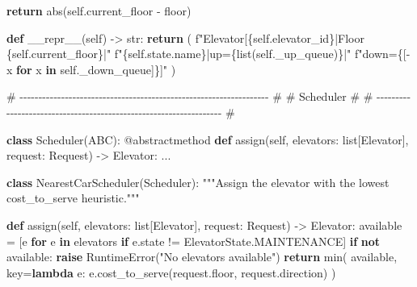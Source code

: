 \documentclass[11pt]{article}
\newenvironment{Shaded}{\begin{snugshade}}{\end{snugshade}}
\newcommand{\AttributeTok}[1]{\textcolor[rgb]{0.16,0.50,0.73}{#1}}
\newcommand{\BuiltInTok}[1]{\textcolor[rgb]{0.50,0.55,0.55}{#1}}
\newcommand{\CommentTok}[1]{\textcolor[rgb]{0.48,0.49,0.49}{#1}}
\newcommand{\ControlFlowTok}[1]{\textcolor[rgb]{0.99,0.74,0.29}{\textbf{#1}}}
\newcommand{\FunctionTok}[1]{\textcolor[rgb]{0.56,0.27,0.68}{#1}}
\newcommand{\KeywordTok}[1]{\textcolor[rgb]{0.81,0.81,0.76}{\textbf{#1}}}
\newcommand{\NormalTok}[1]{\textcolor[rgb]{0.81,0.81,0.76}{#1}}
\newcommand{\OperatorTok}[1]{\textcolor[rgb]{0.81,0.81,0.76}{#1}}
\newcommand{\PreprocessorTok}[1]{\textcolor[rgb]{0.15,0.68,0.38}{#1}}
\newcommand{\SpecialCharTok}[1]{\textcolor[rgb]{0.24,0.68,0.91}{#1}}
\newcommand{\SpecialStringTok}[1]{\textcolor[rgb]{0.85,0.27,0.33}{#1}}
\newcommand{\StringTok}[1]{\textcolor[rgb]{0.96,0.31,0.31}{#1}}
\newcommand{\VariableTok}[1]{\textcolor[rgb]{0.15,0.68,0.68}{#1}}
\begin{document}
\begin{Shaded}
\begin{Highlighting}[]
        \ControlFlowTok{return} \BuiltInTok{abs}\NormalTok{(}\VariableTok{self}\NormalTok{.current\_floor }\OperatorTok{{-}}\NormalTok{ floor)}

    \KeywordTok{def} \FunctionTok{\_\_repr\_\_}\NormalTok{(}\VariableTok{self}\NormalTok{) }\OperatorTok{{-}\textgreater{}} \BuiltInTok{str}\NormalTok{:}
        \ControlFlowTok{return}\NormalTok{ (}
            \SpecialStringTok{f"Elevator[}\SpecialCharTok{\{}\VariableTok{self}\SpecialCharTok{.}\NormalTok{elevator\_id}\SpecialCharTok{\}}\SpecialStringTok{|Floor }\SpecialCharTok{\{}\VariableTok{self}\SpecialCharTok{.}\NormalTok{current\_floor}\SpecialCharTok{\}}\SpecialStringTok{|"}
            \SpecialStringTok{f"}\SpecialCharTok{\{}\VariableTok{self}\SpecialCharTok{.}\NormalTok{state}\SpecialCharTok{.}\NormalTok{name}\SpecialCharTok{\}}\SpecialStringTok{|up=}\SpecialCharTok{\{}\BuiltInTok{list}\NormalTok{(}\VariableTok{self}\NormalTok{.\_up\_queue)}\SpecialCharTok{\}}\SpecialStringTok{|"}
            \SpecialStringTok{f"down=}\SpecialCharTok{\{}\NormalTok{[}\OperatorTok{{-}}\NormalTok{x }\ControlFlowTok{for}\NormalTok{ x }\KeywordTok{in} \VariableTok{self}\NormalTok{.\_down\_queue]}\SpecialCharTok{\}}\SpecialStringTok{]"}
\NormalTok{        )}


\CommentTok{\# {-}{-}{-}{-}{-}{-}{-}{-}{-}{-}{-}{-}{-}{-}{-}{-}{-}{-}{-}{-}{-}{-}{-}{-}{-}{-}{-}{-}{-}{-}{-}{-}{-}{-}{-}{-}{-}{-}{-}{-}{-}{-}{-}{-}{-}{-}{-}{-}{-}{-}{-}{-}{-}{-}{-}{-}{-}{-}{-}{-}{-}{-}{-}{-}{-}{-} \#}
\CommentTok{\# Scheduler                                                           \#}
\CommentTok{\# {-}{-}{-}{-}{-}{-}{-}{-}{-}{-}{-}{-}{-}{-}{-}{-}{-}{-}{-}{-}{-}{-}{-}{-}{-}{-}{-}{-}{-}{-}{-}{-}{-}{-}{-}{-}{-}{-}{-}{-}{-}{-}{-}{-}{-}{-}{-}{-}{-}{-}{-}{-}{-}{-}{-}{-}{-}{-}{-}{-}{-}{-}{-}{-}{-}{-} \#}

\KeywordTok{class}\NormalTok{ Scheduler(ABC):}
    \AttributeTok{@abstractmethod}
    \KeywordTok{def}\NormalTok{ assign(}\VariableTok{self}\NormalTok{, elevators: }\BuiltInTok{list}\NormalTok{[Elevator], request: Request) }\OperatorTok{{-}\textgreater{}}\NormalTok{ Elevator:}
\NormalTok{        ...}


\KeywordTok{class}\NormalTok{ NearestCarScheduler(Scheduler):}
    \CommentTok{"""Assign the elevator with the lowest cost\_to\_serve heuristic."""}

    \KeywordTok{def}\NormalTok{ assign(}\VariableTok{self}\NormalTok{, elevators: }\BuiltInTok{list}\NormalTok{[Elevator], request: Request) }\OperatorTok{{-}\textgreater{}}\NormalTok{ Elevator:}
\NormalTok{        available }\OperatorTok{=}\NormalTok{ [e }\ControlFlowTok{for}\NormalTok{ e }\KeywordTok{in}\NormalTok{ elevators }\ControlFlowTok{if}\NormalTok{ e.state }\OperatorTok{!=}\NormalTok{ ElevatorState.MAINTENANCE]}
        \ControlFlowTok{if} \KeywordTok{not}\NormalTok{ available:}
            \ControlFlowTok{raise} \PreprocessorTok{RuntimeError}\NormalTok{(}\StringTok{"No elevators available"}\NormalTok{)}
        \ControlFlowTok{return} \BuiltInTok{min}\NormalTok{(}
\NormalTok{            available,}
\NormalTok{            key}\OperatorTok{=}\KeywordTok{lambda}\NormalTok{ e: e.cost\_to\_serve(request.floor, request.direction)}
\NormalTok{        )}



\end{Highlighting}
\end{Shaded}
\end{document}

